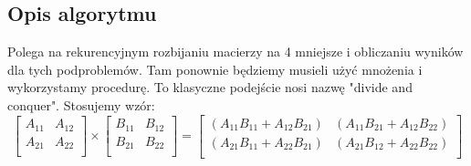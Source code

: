 \documentclass[12pt,a4paper,table]{article}
\begin{document}
    \subsection{Opis algorytmu}
    Polega na rekurencyjnym rozbijaniu macierzy na 4 mniejsze i 
    obliczaniu wyników dla tych podproblemów. Tam ponownie
    będziemy musieli użyć mnożenia i wykorzystamy procedurę.
    To klasyczne podejście nosi nazwę "divide and conquer".
    Stosujemy wzór:
    $$
    \begin{bmatrix}
        A_{11} & A_{12} \\
        A_{21} & A_{22} \\ 
    \end{bmatrix}
    \times
    \begin{bmatrix}
        B_{11} & B_{12} \\
        B_{21} & B_{22} \\ 

    \end{bmatrix}
    =
    \begin{bmatrix}
        (A_{11}B_{11} + A_{12}B_{21}) & (A_{11}B_{21} + A_{12}B_{22}) \\
        (A_{21}B_{11} + A_{22}B_{21}) & (A_{21}B_{12} + A_{22}B_{22}) \\ 
    \end{bmatrix}
    $$
    
\end{document}

